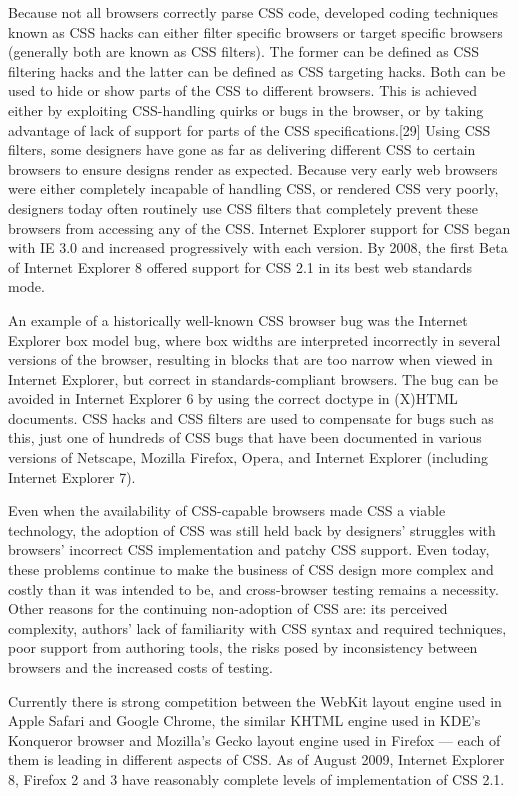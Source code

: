 Because not all browsers correctly parse CSS code, developed coding techniques known as CSS hacks can either filter specific browsers or target specific browsers (generally both are known as CSS filters). The former can be defined as CSS filtering hacks and the latter can be defined as CSS targeting hacks. Both can be used to hide or show parts of the CSS to different browsers. This is achieved either by exploiting CSS-handling quirks or bugs in the browser, or by taking advantage of lack of support for parts of the CSS specifications.[29] Using CSS filters, some designers have gone as far as delivering different CSS to certain browsers to ensure designs render as expected. Because very early web browsers were either completely incapable of handling CSS, or rendered CSS very poorly, designers today often routinely use CSS filters that completely prevent these browsers from accessing any of the CSS. Internet Explorer support for CSS began with IE 3.0 and increased progressively with each version. By 2008, the first Beta of Internet Explorer 8 offered support for CSS 2.1 in its best web standards mode.

An example of a historically well-known CSS browser bug was the Internet Explorer box model bug, where box widths are interpreted incorrectly in several versions of the browser, resulting in blocks that are too narrow when viewed in Internet Explorer, but correct in standards-compliant browsers. The bug can be avoided in Internet Explorer 6 by using the correct doctype in (X)HTML documents. CSS hacks and CSS filters are used to compensate for bugs such as this, just one of hundreds of CSS bugs that have been documented in various versions of Netscape, Mozilla Firefox, Opera, and Internet Explorer (including Internet Explorer 7).


Even when the availability of CSS-capable browsers made CSS a viable technology, the adoption of CSS was still held back by designers' struggles with browsers' incorrect CSS implementation and patchy CSS support. Even today, these problems continue to make the business of CSS design more complex and costly than it was intended to be, and cross-browser testing remains a necessity. Other reasons for the continuing non-adoption of CSS are: its perceived complexity, authors' lack of familiarity with CSS syntax and required techniques, poor support from authoring tools, the risks posed by inconsistency between browsers and the increased costs of testing.

Currently there is strong competition between the WebKit layout engine used in Apple Safari and Google Chrome, the similar KHTML engine used in KDE's Konqueror browser and Mozilla's Gecko layout engine used in Firefox — each of them is leading in different aspects of CSS. As of August 2009, Internet Explorer 8, Firefox 2 and 3 have reasonably complete levels of implementation of CSS 2.1.


